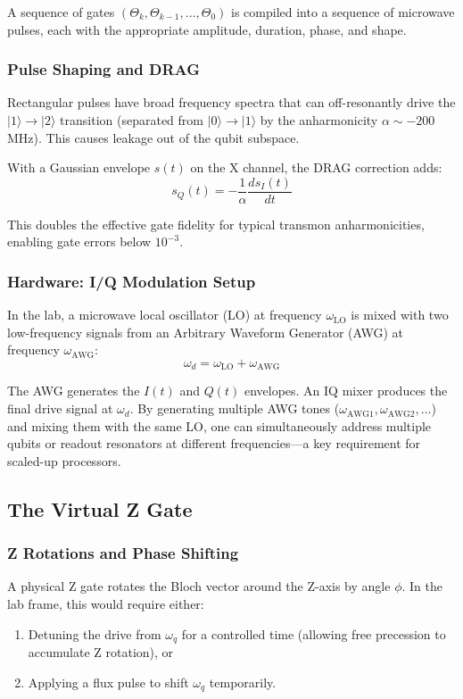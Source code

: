 \documentclass{article}
\begin{document}
A sequence of gates $(\Theta_k, \Theta_{k-1}, \ldots, \Theta_0)$ is compiled into a sequence of microwave pulses, each with the appropriate amplitude, duration, phase, and shape.

\subsubsection*{Pulse Shaping and DRAG}

Rectangular pulses have broad frequency spectra that can off-resonantly drive the $|1\rangle \to |2\rangle$ transition (separated from $|0\rangle \to |1\rangle$ by the anharmonicity $\alpha \sim -200$ MHz). This causes leakage out of the qubit subspace.

With a Gaussian envelope $s(t)$ on the X channel, the DRAG correction adds:
$$s_Q(t) = -\frac{1}{\alpha} \frac{ds_I(t)}{dt}$$

This doubles the effective gate fidelity for typical transmon anharmonicities, enabling gate errors below $10^{-3}$.

\subsubsection*{Hardware: I/Q Modulation Setup}

In the lab, a microwave local oscillator (LO) at frequency $\omega_{\text{LO}}$ is mixed with two low-frequency signals from an Arbitrary Waveform Generator (AWG) at frequency $\omega_{\text{AWG}}$:
$$\omega_d = \omega_{\text{LO}} + \omega_{\text{AWG}}$$

The AWG generates the $I(t)$ and $Q(t)$ envelopes. An IQ mixer produces the final drive signal at $\omega_d$. By generating multiple AWG tones ($\omega_{\text{AWG1}}, \omega_{\text{AWG2}}, \ldots$) and mixing them with the same LO, one can simultaneously address multiple qubits or readout resonators at different frequencies—a key requirement for scaled-up processors.

\subsection{The Virtual Z Gate}

\subsubsection*{Z Rotations and Phase Shifting}

A physical Z gate rotates the Bloch vector around the Z-axis by angle $\phi$. In the lab frame, this would require either:
\begin{enumerate}
    \item Detuning the drive from $\omega_q$ for a controlled time (allowing free precession to accumulate Z rotation), or
    \item Applying a flux pulse to shift $\omega_q$ temporarily.
\end{enumerate}
\end{document}

